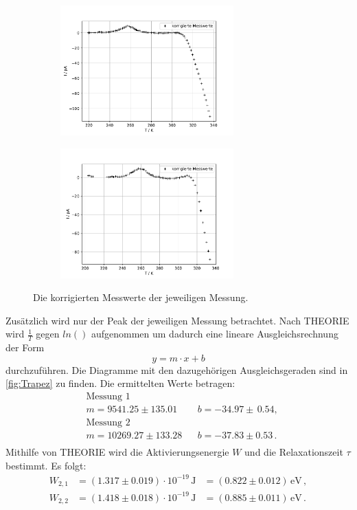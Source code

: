   \begin{figure}
    \begin{subfigure}[b]{.5\linewidth}
      \centering
      \includegraphics[height=5cm, keepaspectratio]{build/korrigierte_werte_1.pdf}
    \end{subfigure}
    \begin{subfigure}[b]{.5\linewidth}
      \centering
      \includegraphics[height=5cm, keepaspectratio]{build/korrigierte_werte_2.pdf}
    \end{subfigure}
    \caption{Die korrigierten Messwerte der jeweiligen Messung.}
    \label{fig:I_T_korrigiert}
  \end{figure} %

  \noindent
  Zusätzlich wird nur der Peak der jeweiligen Messung betrachtet.
  Nach THEORIE wird $\frac{1}{T}$ gegen $ln ()$ aufgenommen um dadurch eine lineare Ausgleichsrechnung der Form
  \begin{equation*}
    y = m \cdot x + b 
  \end{equation*}
  durchzuführen.
  Die Diagramme mit den dazugehörigen Ausgleichsgeraden sind in \autoref{fig:Trapez} zu finden.
  Die ermittelten Werte betragen:
  \begin{align*}
    &\text{Messung 1} \\
    &m = 9541.25 \pm 135.01 && b= -34.97 \pm  \, 0.54 , \\ 
    &\text{Messung 2} \\
    &m = 10269.27 \pm 133.28 && b = -37.83 \pm 0.53\, . \\
  \end{align*}
  \noindent
  Mithilfe von THEORIE wird die Aktivierungsenergie $W$ und die Relaxationszeit $\tau$ bestimmt.
  Es folgt:
  \begin{align*}
    W_{2,1} &= (1.317 \pm 0.019) \cdot 10^{-19} \, \si{\joule} &= (0.822 \pm 0.012) \, \si{\electronvolt} \, ,\\
    W_{2,2} &= (1.418 \pm 0.018) \cdot 10^{-19} \, \si{\joule} &= (0.885 \pm 0.011) \, \si{\electronvolt} \, .\\
  \end{align*}

